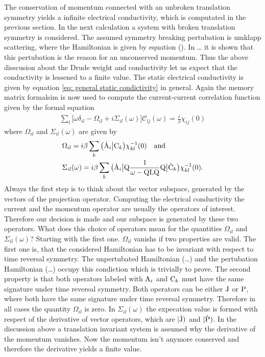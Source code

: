 The conservation of momentum connected with an unbroken translation symmetry yields a infinite electrical conductivity, which is computated in the previous section.
In the next calculation a system with broken translation symmetry is considered.
The assumed symmetry breaking pertubation is umklapp scattering, where the Hamiltonian is given by equation ().
In \dots{} it is shown that this pertubation is the reason for an unconserved momentum.
Thus the above disscusion about the Drude weight and conductivity let us expect that the conductivity is lessened to a finite value.
The static electrical conductivity is given by equation \eqref{eq: general static condictivity} in general.
Again the memory matrix formalsim is now used to compute the current-current correlation function given by the formal equation
%
\begin{align}
	\sum\limits_{l} \Big[\omega \delta_{il} - \Omega_{il} + i \Sigma_{il}(\omega)\Big] \mathcal{C}_{lj}(\omega) = \frac{i}{\beta} \chi_{ij}(0)
\end{align}
%
where $\Omega_{il}$ and $\Sigma_{il}(\omega)$ are given by
%
\begin{align}
	&\Omega_{il} = i \beta \sum\limits_{k} \obraket{\dot{\mt{A}}_{i}}{\mt{C}_{k}} \chi_{kl}^{-1}(0) \qq{and} \\
	&\Sigma_{il}(\omega) = i \beta \sum\limits_{k} \obra{\dot{\mt{A}}_{i}} \mt{Q} \frac{1}{\omega - \mt{QLQ}} \mt{Q} \oket{\dot{\mt{C}}_{k}} \chi_{kl}^{-1}(0).
\end{align}
%
Always the first step is to think about the vector subspace, generated by the vectors of the projection operator.
Computing the electrical conductivity the current and the momentum operator are usually the operators of interest. 
Therefore our decision is made and our subspace is generated by these two operators.
What does this choice of operators mean for the quantities $\Omega_{il}$ and $\Sigma_{il}(\omega)$?
Starting with the first one.
$\Omega_{il}$ vanishs if two properties are valid.
The first one is, that the considered Hamiltonian has to be invariant with respect to time reversal symmetry.
The unpertubated Hamiltonian (\dots{}) and the pertubation Hamiltonian (\dots{}) occupy this condiction which is trivially to prove.
The second property is that both operators labeled with $\mathrm{A}_{i}$ and $\mathrm{C}_{k}$ must have the same signature under time reversal symmetry.
Both operators can be either $\mathrm{J}$ or $\mathrm{P}$, where both have the same signature under time reversal symmetry.
Therefore in all cases the quantity $\Omega_{il}$ is zero.
In $\Sigma_{il}(\omega)$ the expecation value is formed with respect of the derivative of vector operators, which are $|\mathrm{\dot{\mathrm{J}}})$ and $|\mathrm{\dot{\mathrm{P}}})$.
In the discussion above a translation invariant system is assumed why the derivative of the momentum vanishes.
Now the momentum isn't anymore conserved and therefore the derivative yields a finite value.

